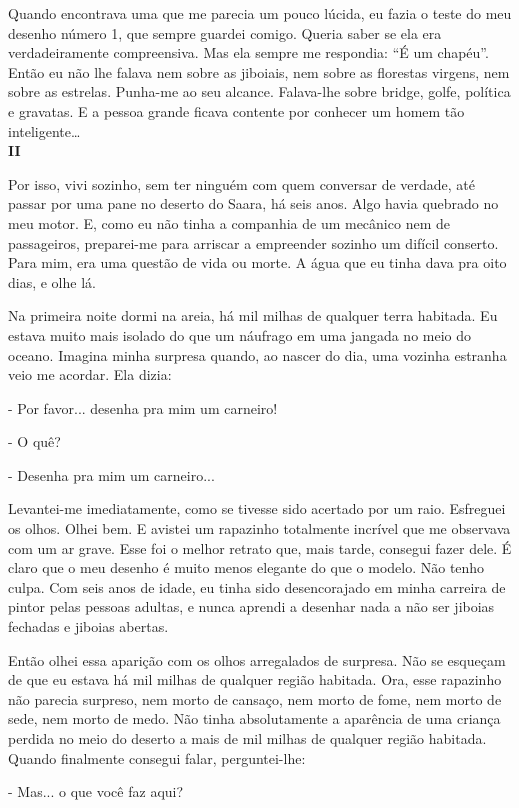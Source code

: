 \begin{Parallel}[p]{}{}
{Quando encontrava uma que me parecia um pouco lúcida, eu fazia o teste
do meu desenho número 1, que sempre guardei comigo. Queria saber se ela
era verdadeiramente compreensiva. Mas ela sempre me respondia: ``É um
chapéu''. Então eu não lhe falava nem sobre as jiboiais, nem sobre as
florestas virgens, nem sobre as estrelas. Punha-me ao seu alcance.
Falava-lhe sobre bridge, golfe, política e gravatas. E a pessoa grande
ficava contente por conhecer um homem tão inteligente\ldots{}\\

\textbf{II}

Por isso, vivi sozinho, sem ter ninguém com quem conversar de verdade,
até passar por uma pane no deserto do Saara, há seis anos. Algo havia
quebrado no meu motor. E, como eu não tinha a companhia de um mecânico
nem de passageiros, preparei-me para arriscar a empreender sozinho um
difícil conserto. Para mim, era uma questão de vida ou morte. A água que
eu tinha dava pra oito dias, e olhe lá.

Na primeira noite dormi na areia, há mil milhas de qualquer terra
habitada. Eu estava muito mais isolado do que um náufrago em uma jangada
no meio do oceano. Imagina minha surpresa quando, ao nascer do dia, uma
vozinha estranha veio me acordar. Ela dizia:

- Por favor... desenha pra mim um carneiro!

- O quê?

- Desenha pra mim um carneiro...

Levantei-me imediatamente, como se tivesse sido acertado por um raio.
Esfreguei os olhos. Olhei bem. E avistei um rapazinho totalmente
incrível que me observava com um ar grave. Esse foi o melhor retrato
que, mais tarde, consegui fazer dele. É claro que o meu desenho é muito
menos elegante do que o modelo. Não tenho culpa. Com seis anos de idade,
eu tinha sido desencorajado em minha carreira de pintor pelas pessoas
adultas, e nunca aprendi a desenhar nada a não ser jiboias fechadas e
jiboias abertas.

Então olhei essa aparição com os olhos arregalados de surpresa. Não se
esqueçam de que eu estava há mil milhas de qualquer região habitada.
Ora, esse rapazinho não parecia surpreso, nem morto de cansaço, nem
morto de fome, nem morto de sede, nem morto de medo. Não tinha
absolutamente a aparência de uma criança perdida no meio do deserto a
mais de mil milhas de qualquer região habitada. Quando finalmente
consegui falar, perguntei-lhe:

- Mas... o que você faz aqui?

}
\end{Parallel}
